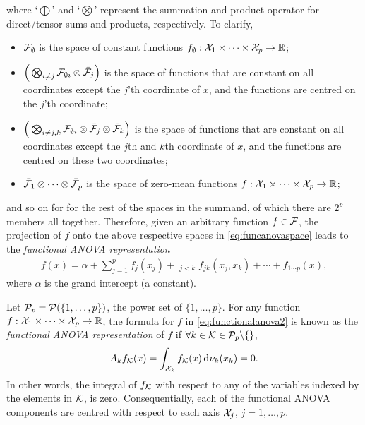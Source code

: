where `$\bigoplus$' and `$\bigotimes$' represent the summation and product operator for direct/tensor sums and products, respectively. 
To clarify,
\begin{itemize}
  \item ${\mathcal F}_{\emptyset}$ is the space of constant functions $f_\emptyset:{\mathcal X}_1\times\cdots\times{\mathcal X}_p\to\mathbb{R}$;
  \item $\Big( \bigotimes_{i\neq j}{\mathcal F}_{\emptyset i} \otimes \bar{{\mathcal F}}_j \Big)$ is the space of functions that are constant on all coordinates except the $j$'th coordinate of $x$, and the functions are centred on the $j$'th coordinate;
  \item $\Big( \bigotimes_{i\neq j,k}{\mathcal F}_{\emptyset i} \otimes \bar{{\mathcal F}}_j \otimes \bar{{\mathcal F}}_k \Big)$ is the space of functions that are constant on all coordinates except the $j$th and $k$th coordinate of $x$, and the functions are centred on these two coordinates;
  \item $\bar{{\mathcal F}}_1 \otimes \cdots \otimes \bar{{\mathcal F}}_p$ is the space of zero-mean functions $f:{\mathcal X}_1\times\cdots\times{\mathcal X}_p\to\mathbb{R}$;
\end{itemize}
and so on for for the rest of the spaces in the summand, of which there are $2^p$ members all together. 
Therefore, given an arbitrary function $f\in{\mathcal F}$, the projection of $f$ onto the above respective 
spaces in \cref{eq:funcanovaspace} leads to the \emph{functional ANOVA representation}
\begin{align}\label{eq:functionalanova2}
  f(x) = \alpha + \sum_{j=1}^p f_j(x_j) + \mathop{\sum_{j,k=1}^p}_{j<k} f_{jk}(x_j,x_k) + \cdots + f_{1\cdots p}(x),
\end{align}
where $\alpha$ is the grand intercept (a constant).

\begin{definition}\label{def:funcanovarep}
  Let ${\mathcal P}_p = {\mathcal P}(\{1,\dots,p\})$, the power set of $\{1,\dots,p\}$.
  For any function $f:{\mathcal X}_1\times\cdots\times{\mathcal X}_p\to\mathbb{R}$, the formula for $f$ in \cref{eq:functionalanova2} is known as the \emph{functional ANOVA representation} of $f$ if $\forall k \in {\mathcal K} \in {\mathcal P}_p \backslash \{ \}$,
  \begin{align}\label{eq:funcanovaorth}
    A_k f_{\mathcal K}(x) = \int_{{\mathcal X}_k} f_{\mathcal K}(x) \operatorname{d}\hspace{0.5pt}\!\nu_k(x_k) = 0.
  \end{align}
  In other words, the integral of $f_{\mathcal K}$ with respect to any of the variables indexed by the elements in ${\mathcal K}$, is zero. 
  Consequentially, each of the functional ANOVA components are centred with respect to each axis ${\mathcal X}_j$, $j=1,\dots,p$.
\end{definition}

